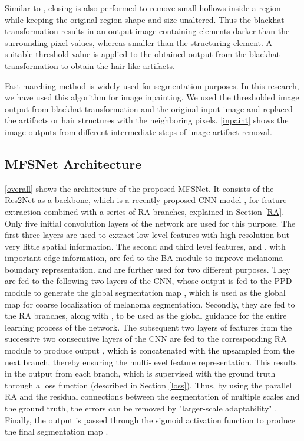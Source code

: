 \documentclass[review]{elsarticle}
\begin{document}
Similar to \cite{wang2014morphological}, closing is also performed to remove small hollows inside a region while keeping the original region shape and size unaltered. Thus the blackhat transformation results in an output image containing elements darker than the surrounding pixel values, whereas smaller than the structuring element. A suitable threshold value is applied to the obtained output from the blackhat transformation to obtain the hair-like artifacts. 

Fast marching method \cite{long2015fully} is widely used for segmentation purposes. In this research, we have used this algorithm for image inpainting. We used the thresholded image output from blackhat transformation and the original input image and replaced the artifacts or hair structures with the neighboring pixels. \autoref{inpaint} shows the image outputs from different intermediate steps of image artifact removal.



\subsection{MFSNet Architecture}\label{architecture}
\autoref{overall} shows the architecture of the proposed MFSNet. It consists of the Res2Net as a backbone, which is a recently proposed CNN model \cite{gao2019res2net}, for feature extraction combined with a series of RA branches, explained in Section \ref{RA}. Only five initial convolution layers of the network are used for this purpose. The first three layers are used to extract low-level features with high resolution but very little spatial information. The second and third level features,  and , with important edge information, are fed to the BA module to improve melanoma boundary representation.  and  are further used for two different purposes. They are fed to the following two layers of the CNN, whose output is fed to the PPD module to generate the global segmentation map , which is used as the global map for coarse localization of melanoma segmentation. Secondly, they are fed to the RA branches, along with , to be used as the global guidance for the entire learning process of the network. The subsequent two layers of features  from the successive two consecutive layers of the CNN are fed to the corresponding RA module to produce output ,\textcolor{black}{ which is concatenated with the upsampled  from the next branch}, thereby ensuring the multi-level feature representation. This results in the output  from each branch, which is supervised with the ground truth  through a loss function (described in Section \ref{loss}). Thus, by using the parallel RA and the residual connections between the segmentation of multiple scales and the ground truth, the errors can be removed by "larger-scale adaptability" \cite{chen2018reverse}. Finally, the output  is passed through the sigmoid activation function to produce the final segmentation map . 
\end{document}
